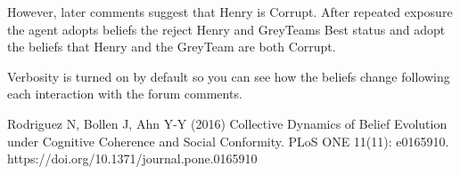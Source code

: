 \documentclass[11pt, a4paper]{article}
\begin{document}
However, later comments suggest that Henry is Corrupt. After repeated
exposure the agent adopts beliefs the reject Henry and GreyTeams Best status
and adopt the beliefs that Henry and the GreyTeam are both Corrupt.

Verbosity is turned on by default so you can see how the beliefs change
following each interaction with the forum comments.

\begin{thebibliography}{1}
 Rodriguez N, Bollen J, Ahn Y-Y (2016) Collective Dynamics of Belief Evolution under Cognitive Coherence and Social Conformity. PLoS ONE 11(11): e0165910. https://doi.org/10.1371/journal.pone.0165910
\end{thebibliography}
\end{document}

